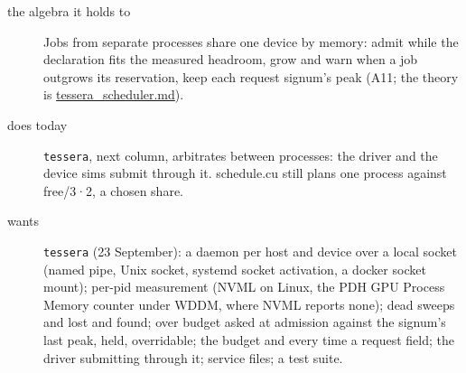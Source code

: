 \begin{description}
\item[{the algebra it holds to}] Jobs from separate processes share one device by memory: admit while the declaration fits the measured headroom, grow and warn when a job outgrows its reservation, keep each request signum's peak (A11; the theory is \hyperref[chap:tessera-scheduler]{tessera\_\allowbreak{}scheduler.md}).
\item[{does today}] \texttt{tessera}, next column, arbitrates between processes: the driver and the device sims submit through it. schedule.cu still plans one process against free/3·2, a chosen share.
\item[{wants}] \texttt{tessera} (23 September): a daemon per host and device over a local socket (named pipe, Unix socket, systemd socket activation, a docker socket mount); per-pid measurement (NVML on Linux, the PDH GPU Process Memory counter under WDDM, where NVML reports none); dead sweeps and lost and found; over budget asked at admission against the signum's last peak, held, overridable; the budget and every time a request field; the driver submitting through it; service files; a test suite.

\end{description}
